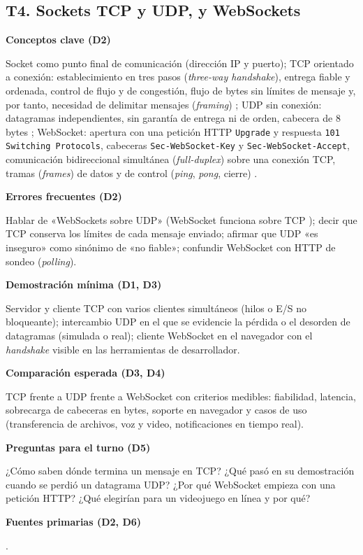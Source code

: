 \documentclass[11pt,a4paper]{article}
\newcommand{\campo}[1]{\par\smallskip\textbf{\color{uteqBlue}#1}\par}
\begin{document}
\subsection{T4. Sockets TCP y UDP, y WebSockets}
\begin{fichaBox}[title={Ficha T4 --- Sockets y WebSockets}]
	\campo{Conceptos clave (D2)}
	Socket como punto final de comunicación (dirección IP y puerto); TCP orientado a conexión: establecimiento en tres pasos (\emph{three-way handshake}), entrega fiable y ordenada, control de flujo y de congestión, flujo de bytes sin límites de mensaje y, por tanto, necesidad de delimitar mensajes (\emph{framing}) \cite{rfc9293}; UDP sin conexión: datagramas independientes, sin garantía de entrega ni de orden, cabecera de 8 bytes \cite{rfc768}; WebSocket: apertura con una petición HTTP \texttt{Upgrade} y respuesta \texttt{101 Switching Protocols}, cabeceras \texttt{Sec-WebSocket-Key} y \texttt{Sec-WebSocket-Accept}, comunicación bidireccional simultánea (\emph{full-duplex}) sobre una conexión TCP, tramas (\emph{frames}) de datos y de control (\emph{ping}, \emph{pong}, cierre) \cite{rfc6455}.
	\campo{Errores frecuentes (D2)}
	Hablar de «WebSockets sobre UDP» (WebSocket funciona sobre TCP \cite{rfc6455}); decir que TCP conserva los límites de cada mensaje enviado; afirmar que UDP «es inseguro» como sinónimo de «no fiable»; confundir WebSocket con HTTP de sondeo (\emph{polling}).
	\campo{Demostración mínima (D1, D3)}
	Servidor y cliente TCP con varios clientes simultáneos (hilos o E/S no bloqueante); intercambio UDP en el que se evidencie la pérdida o el desorden de datagramas (simulada o real); cliente WebSocket en el navegador con el \emph{handshake} visible en las herramientas de desarrollador.
	\campo{Comparación esperada (D3, D4)}
	TCP frente a UDP frente a WebSocket con criterios medibles: fiabilidad, latencia, sobrecarga de cabeceras en bytes, soporte en navegador y casos de uso (transferencia de archivos, voz y video, notificaciones en tiempo real).
	\campo{Preguntas para el turno (D5)}
	¿Cómo saben dónde termina un mensaje en TCP? ¿Qué pasó en su demostración cuando se perdió un datagrama UDP? ¿Por qué WebSocket empieza con una petición HTTP? ¿Qué elegirían para un videojuego en línea y por qué?
	\campo{Fuentes primarias (D2, D6)}
	\cite{rfc9293,rfc768,rfc6455,vansteen2023distributed}.
\end{fichaBox}

\end{document}
